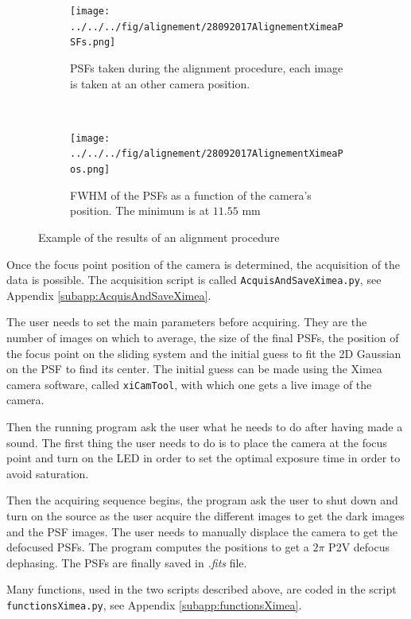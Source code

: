 \begin{figure}
\centering
    \begin{subfigure}{\textwidth}
        \texttt{[image: ../../../fig/alignement/28092017AlignementXimeaPSFs.png]}
        \caption{PSFs taken during the alignment procedure, each image is taken at an other camera position.}
        \label{subfig:28092017AlignementXimeaPSFs}
    \end{subfigure}
    \\
    \begin{subfigure}{0.6\textwidth}
        \texttt{[image: ../../../fig/alignement/28092017AlignementXimeaPos.png]}
        \caption{FWHM of the PSFs as a function of the camera's position. The minimum is at $11.55$ mm}
        \label{subfig:28092017AlignementXimeaPos}
    \end{subfigure}
    \decoRule
    \caption{Example of the results of an alignment procedure}
\end{figure}

Once the focus point position of the camera is determined, the acquisition of the data is possible. The acquisition script is called \verb!AcquisAndSaveXimea.py!, see Appendix \ref{subapp:AcquisAndSaveXimea}.

The user needs to set the main parameters before acquiring. They are the number of images on which to average, the size of the final PSFs, the position of the focus point on the sliding system and the initial guess to fit the 2D Gaussian on the PSF to find its center. The initial guess can be made using the Ximea camera software, called \verb!xiCamTool!, with which one gets a live image of the camera.

Then the running program ask the user what he needs to do after having made a sound. The first thing the user needs to do is to place the camera at the focus point and turn on the LED in order to set the optimal exposure time in order to avoid saturation.

Then the acquiring sequence begins, the program ask the user to shut down and turn on the source as the user acquire the different images to get the dark images and the PSF images. The user needs to manually displace the camera to get the defocused PSFs. The program computes the positions to get a $2\pi$ P2V defocus dephasing. The PSFs are finally saved in \textit{.fits} file.

Many functions, used in the two scripts described above, are coded in the script \verb!functionsXimea.py!, see Appendix \ref{subapp:functionsXimea}.

